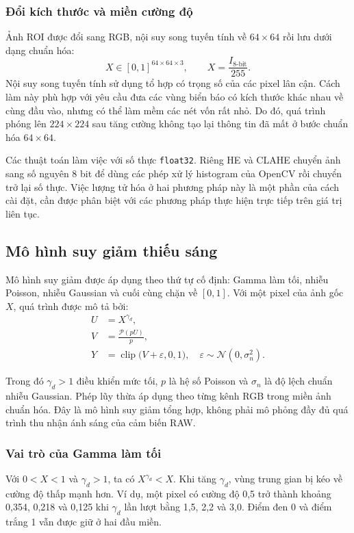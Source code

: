 \subsubsection{Đổi kích thước và miền cường độ}
Ảnh ROI được đổi sang RGB, nội suy song tuyến tính về $64\times64$ rồi lưu dưới dạng chuẩn hóa:
\begin{equation}
X\in[0,1]^{64\times64\times3},\qquad X=\frac{I_{8\text{-bit}}}{255}.
\end{equation}
Nội suy song tuyến tính sử dụng tổ hợp có trọng số của các pixel lân cận. Cách làm này phù hợp với yêu cầu đưa các vùng biển báo có kích thước khác nhau về cùng đầu vào, nhưng có thể làm mềm các nét vốn rất nhỏ. Do đó, quá trình phóng lên $224\times224$ sau tăng cường không tạo lại thông tin đã mất ở bước chuẩn hóa $64\times64$.

Các thuật toán làm việc với số thực \texttt{float32}. Riêng HE và CLAHE chuyển ảnh sang số nguyên 8 bit để dùng các phép xử lý histogram của OpenCV rồi chuyển trở lại số thực. Việc lượng tử hóa ở hai phương pháp này là một phần của cách cài đặt, cần được phân biệt với các phương pháp thực hiện trực tiếp trên giá trị liên tục.

\subsection{Mô hình suy giảm thiếu sáng}
\begin{samepage}
Mô hình suy giảm được áp dụng theo thứ tự cố định: Gamma làm tối, nhiễu Poisson, nhiễu Gaussian và cuối cùng chặn về $[0,1]$. Với một pixel của ảnh gốc $X$, quá trình được mô tả bởi:
\begin{align}
U &= X^{\gamma_d},\label{eq:dark}\\
V &= \frac{\mathcal{P}(pU)}{p},\label{eq:poisson}\\
Y &= \operatorname{clip}\bigl(V+\varepsilon,0,1\bigr),\quad
\varepsilon\sim\mathcal{N}(0,\sigma_n^2).\label{eq:degradation}
\end{align}
\end{samepage}
Trong đó $\gamma_d>1$ điều khiển mức tối, $p$ là hệ số Poisson và $\sigma_n$ là độ lệch chuẩn nhiễu Gaussian. Phép lũy thừa áp dụng theo từng kênh RGB trong miền ảnh chuẩn hóa. Đây là mô hình suy giảm tổng hợp, không phải mô phỏng đầy đủ quá trình thu nhận ánh sáng của cảm biến RAW.

\subsubsection{Vai trò của Gamma làm tối}
Với $0<X<1$ và $\gamma_d>1$, ta có $X^{\gamma_d}<X$. Khi tăng $\gamma_d$, vùng trung gian bị kéo về cường độ thấp mạnh hơn. Ví dụ, một pixel có cường độ 0,5 trở thành khoảng 0,354, 0,218 và 0,125 khi $\gamma_d$ lần lượt bằng 1,5, 2,2 và 3,0. Điểm đen 0 và điểm trắng 1 vẫn được giữ ở hai đầu miền.

